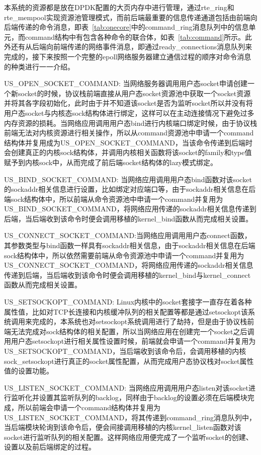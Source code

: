 本系统的资源都是放在DPDK配置的大页内存中进行管理，通过rte\_ring和rte\_mempool实现资源池管理模式，而前后端最重要的信息传递通道包括由前端向后端传递的命令消息，即表~\ref{tab:onecore}中的command\_ring消息队列中的信息单元，而command结构中有包含各种命令的联合体，如表~\ref{tab:command}所示。此外还有从后端向前端传递的网络事件消息，即通过ready\_connections消息队列来完成的，接下来按照一个完整的epoll网络服务器建立通信过程的顺序对命令消息的种类进行一一介绍。

US\_OPEN\_SOCKET\_COMMAND: 当网络服务器调用用户态socket申请创建一个新socket的时候，协议栈前端直接从用户态socket资源池中获取一个socket资源并将其各字段初始化，此时由于并不知道该socket是否为监听socket所以并没有将用户态socket与内核态sock结构体进行绑定，这样可以在主动连接情况下避免过多内存资源的损耗。当网络应用调用用户态bind进行内核端口绑定时候，由于协议栈前端无法对内核资源进行相关操作，所以从command资源池中申请一个command结构体并复用成为US\_OPEN\_SOCKET\_COMMAND，当该命令传递到后端时会创建真正的内核sock结构体，并调用内核相关函数将该socket的family和type值赋予到内核sock中，从而完成了前后端socket结构体的lazy模式绑定。

US\_BIND\_SOCKET\_COMMAND: 当网络应用调用用户态bind函数对该socket的sockaddr相关信息进行设置，比如绑定对应端口等，由于sockaddr相关信息在后端sock结构体中，所以前端从命令资源池中申请一个command并复用为US\_BIND\_SOCKET\_COMMAND，将网络应用传递的sockaddr相关信息传递到后端，当后端收到该命令时便会调用移植的kernel\_bind函数从而完成相关设置。

US\_CONNECT\_SOCKET\_COMMAND:当网络应用调用用户态connect函数，其参数类型与bind函数一样具有sockaddr相关信息，由于sockaddr相关信息在后端sock结构体中，所以依然需要前端从命令资源池中申请一个command并复用为US\_CONNECT\_SOCKET\_COMMAND，将网络应用传递的sockaddr相关信息传递到后端，当后端收到该命令时便会调用移植的kernel\_bind与kernel\_connect函数从而完成相关设置。

US\_SETSOCKOPT\_COMMAND: Linux内核中的socket套接字一直存在着各种属性值，比如对TCP长连接和内核缓冲队列的相关配置等都是通过setsockopt该系统调用来完成的，本系统也对setsockopt系统调用进行了劫持，但是由于协议栈前端无法完成对sock结构体的相关配置，所以当网络应用在创建完一个socket之后调用用户态setsockopt进行相关属性设置时候，前端就会申请一个command并复用为US\_SETSOCKOPT\_COMMAND，当后端收到该命令后，会调用移植的内核sock\_setsockopt进行真正的socket属性配置，从而完成用户态协议栈对socket属性值的设置功能。

US\_LISTEN\_SOCKET\_COMMAND: 当网络应用调用用户态listen对该socket进行监听化并设置其监听队列的backlog，同样由于backlog的设置必须在后端模块完成，所以前端会申请一个command结构体并复用为US\_LISTEN\_SOCKET\_COMMAND，将其传递到command\_ring消息队列中，当后端模块轮询到该命令后，便会间接调用移植的内核kernel\_listen函数对该socket进行监听队列的相关配置。这样网络应用便完成了一个监听socket的创建、设置以及前后端绑定的过程。

